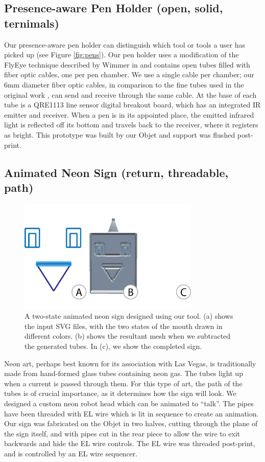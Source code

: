 \subsection{Presence-aware Pen Holder (open, solid, ternimals)}

Our presence-aware pen holder can distinguish which tool or tools a user has picked up (see Figure \ref{fig:pens}).  Our pen holder uses a modification of the FlyEye technique described by Wimmer in \cite{Wimmer-flyeye} and contains open tubes filled with fiber optic cables, one per pen chamber.  We use a single cable per chamber; our 6mm diameter fiber optic cables, in comparison to the fine tubes used in the original work , can send and receive through the same cable.  At the base of each tube is a QRE1113 line sensor digital breakout board, which has an integrated IR emitter and receiver.   When a pen is in its appointed place, the emitted infrared light is reflected off its bottom and travels back to the receiver, where it registers as bright.  This prototype was built by our Objet and support was flushed post-print. 

\subsection{Animated Neon Sign (return, threadable, path)}

\begin{figure}[h!]
\centering
    \includegraphics[width=3.4in]{figures/sign.png}
\caption{A two-state animated neon sign designed using our tool.  (a) shows the input SVG files, with the two states of the mouth drawn in different colors.  (b) shows the resultant mesh when we subtracted the generated tubes.  In (c), we show the completed sign.}
\label{fig:neon}
\end{figure}

Neon art, perhaps best known for its association with Las Vegas, is traditionally made from hand-formed glass tubes containing neon gas.  The tubes light up when a current is passed through them.  For this type of art, the path of the tubes is of crucial importance, as it determines how the sign will look.  We designed a custom neon robot head which can be animated to ``talk''.  The pipes have been threaded with EL wire which is lit in sequence to create an animation.  Our sign was fabricated on the Objet in two halves, cutting through the plane of the sign itself, and with pipes cut in the rear piece to allow the wire to exit backwards and hide the EL wire controls.  The EL wire was threaded post-print, and is controlled by an EL wire sequencer.

